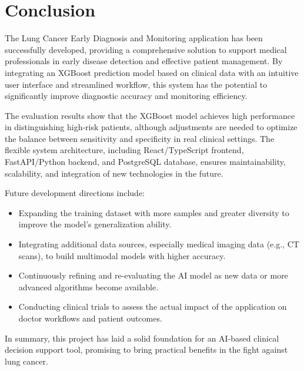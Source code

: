 \section{Conclusion}

The Lung Cancer Early Diagnosis and Monitoring application has been successfully developed, providing a comprehensive solution to support medical professionals in early disease detection and effective patient management. By integrating an XGBoost prediction model based on clinical data with an intuitive user interface and streamlined workflow, this system has the potential to significantly improve diagnostic accuracy and monitoring efficiency.

The evaluation results show that the XGBoost model achieves high performance in distinguishing high-risk patients, although adjustments are needed to optimize the balance between sensitivity and specificity in real clinical settings. The flexible system architecture, including React/TypeScript frontend, FastAPI/Python backend, and PostgreSQL database, ensures maintainability, scalability, and integration of new technologies in the future.

Future development directions include:
\begin{itemize}
    \item Expanding the training dataset with more samples and greater diversity to improve the model's generalization ability.
    \item Integrating additional data sources, especially medical imaging data (e.g., CT scans), to build multimodal models with higher accuracy.
    \item Continuously refining and re-evaluating the AI model as new data or more advanced algorithms become available.
    \item Conducting clinical trials to assess the actual impact of the application on doctor workflows and patient outcomes.
\end{itemize}

In summary, this project has laid a solid foundation for an AI-based clinical decision support tool, promising to bring practical benefits in the fight against lung cancer.
